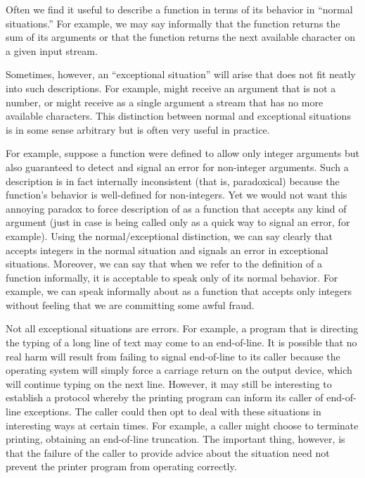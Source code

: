 Often we find it useful to describe a function in terms of its behavior in
``normal situations.'' For example, we may say informally that the function
\cd{+} returns the sum of its arguments or that the function
 returns the next available character on a given input
stream.

Sometimes, however, an ``exceptional situation'' will arise that does not fit
neatly into such descriptions. For example, \cd{+} might receive an argument
that is not a number, or  might receive as a single argument
a stream that has no more available characters.  This distinction between normal
and exceptional situations is in some sense arbitrary but is often very
useful in practice.

For example, suppose a function  were defined to allow only
integer arguments but also guaranteed to
detect and signal an error for non-integer arguments.
Such a description is in fact internally inconsistent (that is,
paradoxical) because the function's behavior is well-defined for non-integers.
Yet we would not want this annoying paradox to force description of 
as a function that accepts any kind of argument (just in case 
is being called only as a quick way to signal an error, for example).
Using the normal/exceptional distinction, we can say clearly that  accepts integers
in the normal situation and signals an error in exceptional situations.
Moreover, we can say that when we refer to the definition of a
function informally, it is acceptable to speak only of its normal behavior.
For example, we can speak informally about  as a function that accepts only
integers without feeling that we are committing some awful fraud.

Not all exceptional situations are errors.  For example, a program that is
directing the typing of a long line of text may come to an end-of-line.
It is possible that no real harm will result from failing to signal end-of-line
to its caller because the operating system will simply force a carriage
return on the output device, which will continue typing on the next line. However, it
may still be interesting to establish a protocol whereby the printing program can
inform its caller of end-of-line exceptions. The caller could
then opt to deal with these situations in interesting ways at certain times.
For example, a caller might choose to terminate printing, obtaining an end-of-line
truncation. The important thing, however, is that the failure of the
caller to provide advice about the situation need not prevent
the printer program from operating correctly.

